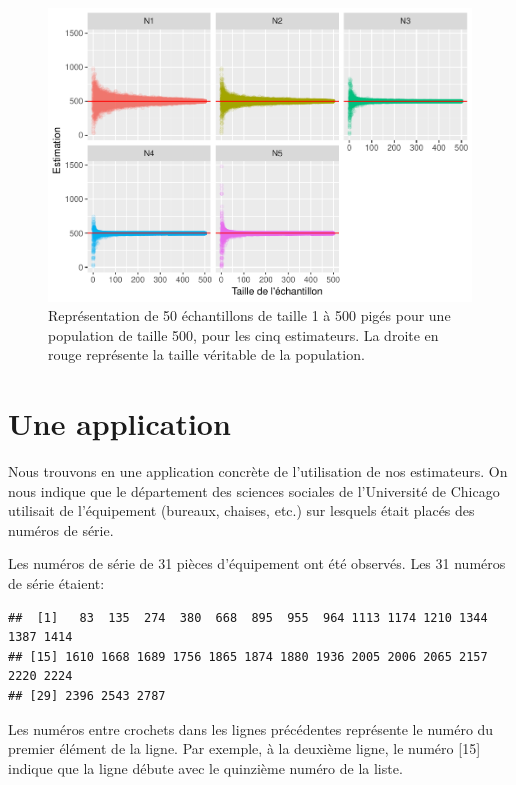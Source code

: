 \documentclass[10pt]{article}
\begin{document}
\begin{figure}[!htb]

{\centering \includegraphics[width=0.9\linewidth]{serial_number_amq_files/figure-latex/pop-1-500-1} 

}

\caption{Représentation de 50 échantillons de taille 1 à 500 pigés pour une population de taille 500, pour les cinq estimateurs. La droite en rouge représente la taille véritable de la population.}\label{fig:pop-1-500}
\end{figure}

\hypertarget{une-application}{%
\section{\texorpdfstring{Une application
\label{application}}{Une application }}\label{une-application}}

Nous trouvons en \cite{Goodman1954} une application concrète de
l'utilisation de nos estimateurs. On nous indique que le département des
sciences sociales de l'Université de Chicago utilisait de l'équipement
(bureaux, chaises, etc.) sur lesquels était placés des numéros de série.

Les numéros de série de 31 pièces d'équipement ont été observés. Les 31
numéros de série étaient:

\begin{verbatim}
##  [1]   83  135  274  380  668  895  955  964 1113 1174 1210 1344 1387 1414
## [15] 1610 1668 1689 1756 1865 1874 1880 1936 2005 2006 2065 2157 2220 2224
## [29] 2396 2543 2787
\end{verbatim}

Les numéros entre crochets dans les lignes précédentes représente le
numéro du premier élément de la ligne. Par exemple, à la deuxième ligne,
le numéro {[}15{]} indique que la ligne débute avec le quinzième numéro
de la liste.
\end{document}
